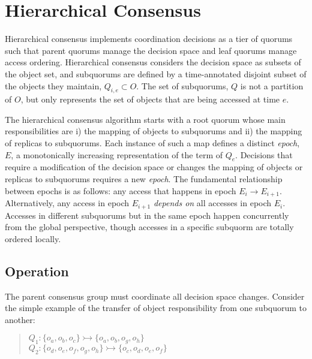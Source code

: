 \documentclass[11pt,letterpaper]{article}
\begin{document}
\section{Hierarchical Consensus}

Hierarchical consensus implements coordination decisions as a tier of quorums such that
parent quorums manage the decision space and leaf quorums manage access ordering.
Hierarchical consensus considers the decision space as subsets of the object set, and
subquorums are defined by a time-annotated disjoint subset of the objects they maintain,
$Q_{i,e} \subset O$.
The set of subquorums, $Q$ is not a partition of $O$, but only represents the set of
objects that are being accessed at time $e$.

The hierarchical consensus algorithm starts with a root quorum whose main
responsibilities are i) the mapping of objects to subquorums and ii) the mapping of
replicas to subquorums.
Each instance of such a map defines a distinct \textit{epoch}, $E$, a monotonically
increasing representation of the term of $Q_e$.
Decisions that require a modification of the decision space or changes the mapping of
objects or replicas to subquorums requires a new \textit{epoch}. The fundamental
relationship between epochs is as follows: any access that happens in epoch
$E_i \rightarrow E_{i+1}$. Alternatively, any access in epoch $E_{i+1}$
\textit{depends on} all accesses in epoch $E_i$.
Accesses in different subquorums but in the same epoch happen concurrently from the global
perspective, though accesses in a specific subquorm are totally ordered locally.

\subsection{Operation}

The parent consensus group must coordinate all decision space changes.
Consider the simple example of the transfer of object responsibility from one subquorum
to another:

\begin{quote}
\small
   $Q_1: \{o_a,o_b,o_c\} \rightarrowtail \{o_a,o_b,o_g,o_h\}$\\
   $Q_2: \{o_d,o_e,o_f,o_g,o_h\} \rightarrowtail \{o_c,o_d,o_e,o_f\}$
\end{quote}
\end{document}
